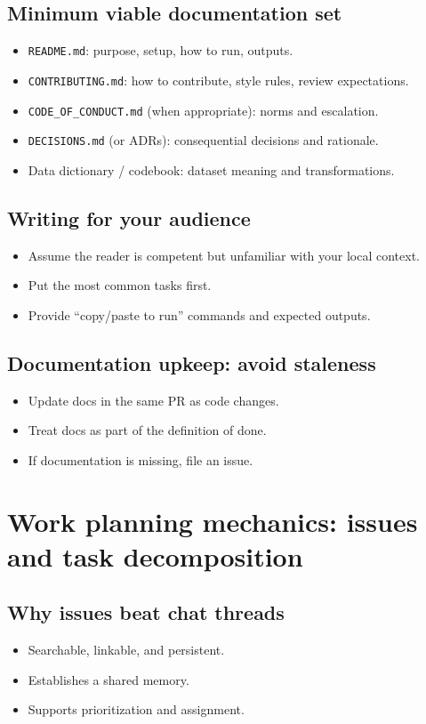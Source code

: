 \subsection{Minimum viable documentation set}
\begin{itemize}
\item \texttt{README.md}: purpose, setup, how to run, outputs.
\item \texttt{CONTRIBUTING.md}: how to contribute, style rules, review expectations.
\item \texttt{CODE\_OF\_CONDUCT.md} (when appropriate): norms and escalation.
\item \texttt{DECISIONS.md} (or ADRs): consequential decisions and rationale.
\item Data dictionary / codebook: dataset meaning and transformations.
\end{itemize}

\subsection{Writing for your audience}
\begin{itemize}
\item Assume the reader is competent but unfamiliar with your local context.
\item Put the most common tasks first.
\item Provide ``copy/paste to run'' commands and expected outputs.
\end{itemize}

\subsection{Documentation upkeep: avoid staleness}
\begin{itemize}
\item Update docs in the same PR as code changes.
\item Treat docs as part of the definition of done.
\item If documentation is missing, file an issue.
\end{itemize}

\section{Work planning mechanics: issues and task decomposition}
\subsection{Why issues beat chat threads}
\begin{itemize}
\item Searchable, linkable, and persistent.
\item Establishes a shared memory.
\item Supports prioritization and assignment.
\end{itemize}

